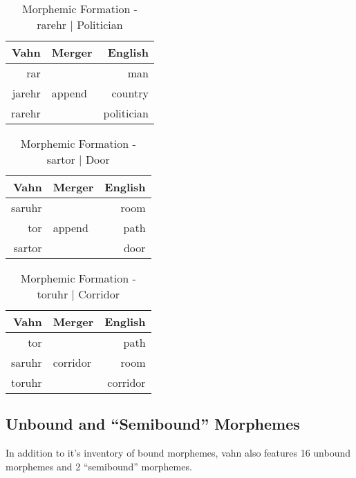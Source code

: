 \documentclass{article}
\begin{document}
\begin{table}[H]
\centering
\begin{tabular}{r|l||r}
Vahn     & Merger & English  \\
\hline\hline
rar &       & man      \\
jarehr & append  & country    \\
\hline \hline
rarehr &        & politician \\
\end{tabular}
\caption{Morphemic Formation - rarehr | Politician}
\label{Morphemic Formation - rarehr | Politician}
\end{table}

\begin{table}[H]
\centering
\begin{tabular}{r|l||r}
Vahn     & Merger & English  \\
\hline\hline
saruhr &       & room\\
tor & append  & path \\
\hline \hline
sartor &        & door \\
\end{tabular}
\caption{Morphemic Formation - sartor | Door}
\label{Morphemic Formation - sartor | Door}
\end{table}

\begin{table}[H]
\centering
\begin{tabular}{r|l||r}
Vahn     & Merger & English  \\
\hline\hline
tor &       &  path\\
saruhr & corridor & room \\
\hline \hline
toruhr &        & corridor\\
\end{tabular}
\caption{Morphemic Formation - toruhr | Corridor}
\label{Morphemic Formation - toruhr | Corridor}
\end{table}

\subsection{Unbound and ``Semibound'' Morphemes}

In addition to it's inventory of bound morphemes, vahn also features 16 unbound morphemes and 2 ``semibound'' morphemes.
\end{document}
